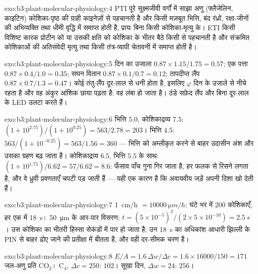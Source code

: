 \begin{solution}{exo:b3:plant-molecular-physiology:4}
PTI पूरे सूक्ष्मजीवी वर्गों में साझा अणु (फ्लैजेलिन, काइटिन)
कोशिका-पृष्ठ की ग्राही काइनेज़ों से पहचानती है और किसी मज़बूत भित्ति,
बंद रंध्रों, रक्षा-जीनों की अभिव्यक्ति तथा धीमी वृद्धि में समाप्त होती
है, प्रायः बिना किसी कोशिका-मृत्यु के। ETI किसी विशिष्ट कारक प्रोटीन
को या उसकी क्षति को कोशिका के भीतर बैठे किसी  से पहचानती है
और संक्रमित कोशिकाओं की अतिसंवेदी मृत्यु तथा किसी तंत्र-व्यापी चेतावनी
में समाप्त होती है।
\end{solution}

\begin{solution}{exo:b3:plant-molecular-physiology:5}
दिन का उजाला $0.87\times 1.15/1.75 = 0.57$; एक पत्ता $0.87\times 0.4/1.0 =
0.35$; सघन वितान $0.87\times 0.1/0.7 = 0.12$; तापदीप्त लैंप
$0.87\times 0.7/1.3 = 0.47$। कोई तंतु-लैंप दूर-लाल से धनी होता है,
इसलिए $\varphi$ दिन के उजाले से नीचे रहता है और वह अंकुर आंशिक छाया
पढ़ता है: वह लंबा हो जाता है। ठंडे सफ़ेद लैंप और बिना दूर-लाल के LED
उलटा करते हैं।
\end{solution}

\begin{solution}{exo:b3:plant-molecular-physiology:6}
भित्ति $5.0$, कोशिकाद्रव्य $7.5$: $(1 + 10^{2.75})/(1 + 10^{0.25}) = 563/2.78
= 203$। भित्ति $4.5$: $563/(1 + 10^{-0.25}) = 563/1.56 = 360$ ---
भित्ति को अम्लीकृत करने से बाहर उदासीन अंश और उसका ग्रहण बढ़ जाता है।
कोशिकाद्रव्य $6.5$, भित्ति $5.5$ के साथ: $(1 + 10^{1.75})/6.62 = 57/6.62 = 8.6$:
फँसाव पाँच गुना गिर जाता है,  हर फलक से रिसने लगता है, और वे
ध्रुवी प्रवणताएँ चपटी पड़ जाती हैं --- यही एक कारण है कि अवायवीय जड़ें
अपनी दिशा खो देती हैं।
\end{solution}

\begin{solution}{exo:b3:plant-molecular-physiology:7}
\qty{1}{cm/h} $= \qty{10000}{\micro m/h}$: घंटे भर में $200$ कोशिकाएँ,
हर एक में \qty{18}{s}। \qty{50}{\micro m} के आर-पार विसरण: $t =
(5\times 10^{-5})^{2}/(2\times 5\times 10^{-10}) = \qty{2.5}{s}$। उस
कोशिका का भीतरी हिस्सा सेकंडों में पार हो जाता है; उन \qty{18}{s} का
अधिकांश आधारी झिल्ली के PIN से बाहर ढोए जाने की प्रतीक्षा में बीतता है,
और वही दर-सीमक चरण है।
\end{solution}

\begin{solution}{exo:b3:plant-molecular-physiology:8}
$E/A = 1.6\,\Delta w/\Delta c = 1.6\times\num{16000}/150 = 171$ जल-अणु
प्रति CO$_{2}$। C$_{4}$, $\Delta c = 250$: $102$। सूखा दिन,
$\Delta w = 24$: $256$।
\end{solution}

